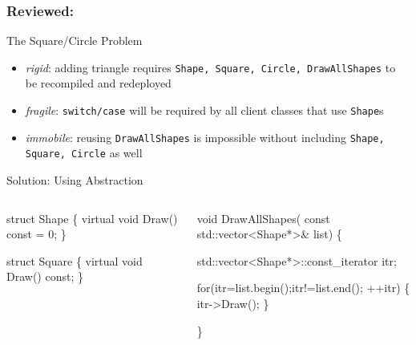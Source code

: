 \documentclass[9pt]{beamer}
\begin{document}
\begin{frame}[fragile]
  \frametitle{Reviewed: \secname}
  \begin{block}{The Square/Circle Problem}
    \begin{itemize}
    \item \emph{rigid}: adding triangle requires \texttt{Shape, Square, Circle, DrawAllShapes} to be recompiled and redeployed
    \item \emph{fragile}: \texttt{switch/case} will be required by all client classes that use \texttt{Shape}s
    \item \emph{immobile}: reusing \texttt{DrawAllShapes} is impossible without including \texttt{Shape, Square, Circle} as well
    \end{itemize}
  \end{block}
\pause
\begin{block}{Solution: Using Abstraction}
    
    \begin{columns}[t]
      \begin{column}{.45\textwidth}
        \small
        \begin{semiverbatim}
struct Shape \{ 
  virtual void Draw() const = 0; 
\}

struct Square \{ 
  virtual void Draw() const; 
\}
        \end{semiverbatim}
      \end{column}
      \begin{column}{.45\textwidth}
        \scriptsize
        \begin{semiverbatim}
void DrawAllShapes(
  const std::vector<Shape*>& list) \{

  std::vector<Shape*>::const_iterator itr; 

  for(itr=list.begin();itr!=list.end(); ++itr) 
  \{ 
    itr->Draw(); 
  \}

\}
        \end{semiverbatim}
      \end{column}

    \end{columns}

  \end{block}



\end{frame}
\end{document}
